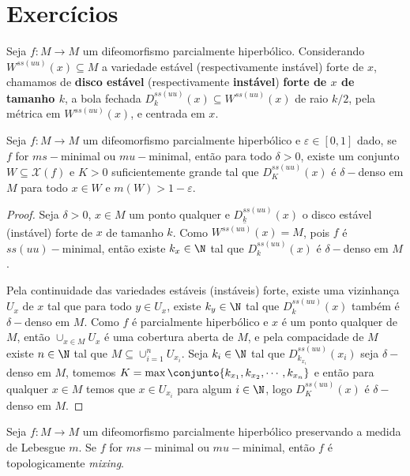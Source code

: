 

\chapter{Exercícios}

\begin{definicao} Seja $f:M\to M$ um difeomorfismo parcialmente hiperbólico. Considerando $W^{ss(uu)}(x)\subseteq M$ a variedade estável (respectivamente instável) forte de $x$, chamamos de \textbf{disco estável} (respectivamente \textbf{instável}) \textbf{forte de $x$ de tamanho $k$}, a bola fechada $D_k^{ss(uu)}(x)\subseteq W^{ss(uu)}(x)$ de raio $k/2$, pela métrica em $W^{ss(uu)}(x)$, e centrada em $x$.
\end{definicao}



\begin{lema}\label{lemadeltadenso} Seja $f:M\to M$ um difeomorfismo parcialmente hiperbólico e $\varepsilon\in[0,1]$ dado, se $f$ for $ms-$minimal ou $mu-$minimal, então para todo $\delta>0$, existe um conjunto $W\subseteq\mathcal{X}(f)$ e $K>0$ suficientemente grande tal que $D_K^{ss(uu)}(x)$ é $\delta-$denso em $M$ para todo $x\in W$ e $m(W)>1-\varepsilon$.
\end{lema}

\begin{proof} Seja $\delta>0$, $x\in M$ um ponto qualquer e $D_{k}^{ss(uu)}(x)$ o disco estável (instável) forte de $x$ de tamanho $k$. Como $\overline{W^{ss(uu)}(x)}=M$, pois $f$ é $ss(uu)-$minimal, então existe $k_x\in\N$ tal que $D_{k}^{ss(uu)}(x)$ é $\delta-$denso em $M$. 

Pela continuidade das variedades estáveis (instáveis) forte, existe uma vizinhança $U_x$ de $x$ tal que para todo $y\in U_x$, existe $k_y\in\N$ tal que $D_{k}^{ss(uu)}(x)$ também é $\delta-$denso em $M$. Como $f$ é parcialmente hiperbólico e $x$ é um ponto qualquer de $M$, então $\cup_{x\in M}{U_x}$ é uma cobertura aberta de $M$, e pela compacidade de $M$ existe $n\in \N$ tal que $M\subseteq \cup_{i=1}^{n}{U_{x_i}}$. Seja $k_i\in \N$ tal que $D_{k_{x_i}}^{ss(uu)}(x_i)$ seja $\delta-$denso em $M$, tomemos $K=\max\conjunto{k_{x_1},k_{x_2},\cdots,k_{x_n}}$ e então para qualquer $x\in M$ temos que $x\in U_{x_i}$ para algum $i\in\N$, logo $D_{K}^{ss(uu)}(x)$ é $\delta-$denso em $M$.
\end{proof}


\begin{teorema} Seja $f:M\to M$ um difeomorfismo parcialmente hiperbólico preservando a medida de Lebesgue $m$. Se $f$ for $ms-$minimal ou $mu-$minimal, então $f$ é topologicamente \textit{mixing}.
\end{teorema}

